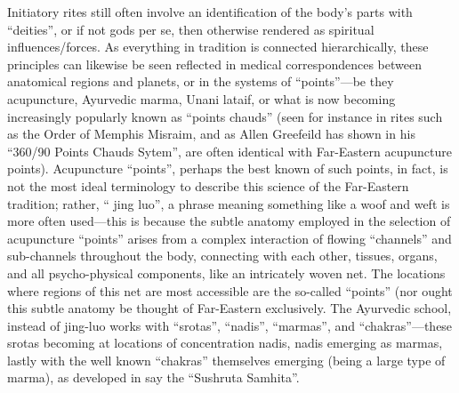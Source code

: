 Initiatory rites still often involve an identification of the body's parts with ``deities'', or if not gods per se, then otherwise rendered as spiritual influences/forces. As everything in tradition is connected hierarchically, these principles can likewise be seen reflected in medical correspondences between anatomical regions and planets, or in the systems of ``points''---be they acupuncture, Ayurvedic marma, Unani lataif, or what is now becoming increasingly popularly known as ``points chauds'' (seen for instance in rites such as the Order of Memphis Misraim, and as Allen Greefeild has shown in his ``360/90 Points Chauds Sytem'', are often identical with Far-Eastern acupuncture points). Acupuncture ``points'', perhaps the best known of such points, in fact, is not the most ideal terminology to describe this science of the Far-Eastern tradition; rather, `` jing luo'', a phrase meaning something like a woof and weft is more often used---this is because the subtle anatomy employed in the selection of acupuncture ``points'' arises from a complex interaction of flowing ``channels'' and sub-channels throughout the body, connecting with each other, tissues, organs, and all psycho-physical components, like an intricately woven net. The locations where regions of this net are most accessible are the so-called ``points'' (nor ought this subtle anatomy be thought of Far-Eastern exclusively. The Ayurvedic school, instead of jing-luo works with ``srotas'', ``nadis'', ``marmas'', and ``chakras''---these srotas becoming at locations of concentration nadis, nadis emerging as marmas, lastly with the well known ``chakras'' themselves emerging (being a large type of marma), as developed in say the ``Sushruta Samhita''.

